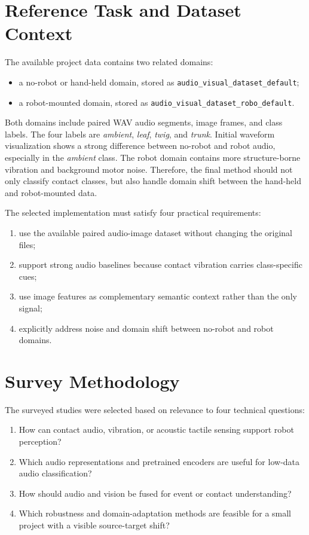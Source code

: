 \documentclass[12pt,a4paper]{article}
\begin{document}
\section{Reference Task and Dataset Context}

The available project data contains two related domains:

\begin{itemize}[leftmargin=1.5em]
\item a no-robot or hand-held domain, stored as \texttt{audio\_visual\_dataset\_default};
\item a robot-mounted domain, stored as \texttt{audio\_visual\_dataset\_robo\_default}.
\end{itemize}

Both domains include paired WAV audio segments, image frames, and class labels. The four labels are \textit{ambient}, \textit{leaf}, \textit{twig}, and \textit{trunk}. Initial waveform visualization shows a strong difference between no-robot and robot audio, especially in the \textit{ambient} class. The robot domain contains more structure-borne vibration and background motor noise. Therefore, the final method should not only classify contact classes, but also handle domain shift between the hand-held and robot-mounted data.

The selected implementation must satisfy four practical requirements:

\begin{enumerate}[leftmargin=1.5em]
\item use the available paired audio-image dataset without changing the original files;
\item support strong audio baselines because contact vibration carries class-specific cues;
\item use image features as complementary semantic context rather than the only signal;
\item explicitly address noise and domain shift between no-robot and robot domains.
\end{enumerate}

\section{Survey Methodology}

The surveyed studies were selected based on relevance to four technical questions:

\begin{enumerate}[leftmargin=1.5em]
\item How can contact audio, vibration, or acoustic tactile sensing support robot perception?
\item Which audio representations and pretrained encoders are useful for low-data audio classification?
\item How should audio and vision be fused for event or contact understanding?
\item Which robustness and domain-adaptation methods are feasible for a small project with a visible source-target shift?
\end{enumerate}
\end{document}

